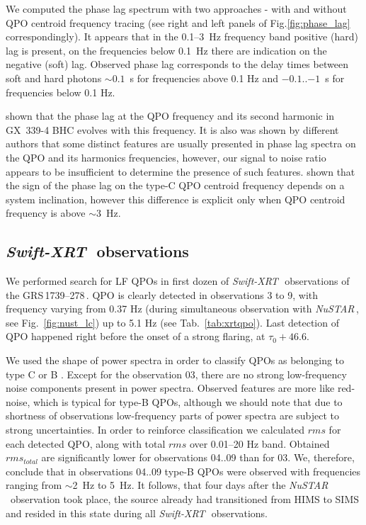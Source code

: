 \documentclass[a4paper,fleqn,usenatbib]{mnras}
\def\grs{{GRS\,1739--278\,}}
\def\swiftx{{\em Swift-XRT\,}}
\def\nustar{{\em NuSTAR\,}}
\begin{document}
We computed the phase lag spectrum with two approaches - with and without QPO centroid frequency tracing (see right and left panels of Fig.\ref{fig:phase_lag} correspondingly).
It appears that in the 0.1--3~Hz frequency band positive (hard) lag is present, on the frequencies below 0.1~Hz there are indication on the negative (soft) lag.
Observed phase lag corresponds to the delay times between soft and hard photons $\sim0.1$~s for frequencies above 0.1 Hz and $-0.1$..$-1$~s for frequencies below 0.1 Hz.

\citet{2017ApJ...845..143Z} shown that the phase lag at the QPO frequency and its second harmonic in GX~339-4 BHC evolves with this frequency. 
It is also was shown by different authors \citep[see, e.g.,][]{2013ApJ...778..136P, 2017ApJ...845..143Z} that some distinct features are usually presented in phase lag spectra on the QPO and its harmonics frequencies, however, our signal to noise ratio appears to be insufficient to determine the presence of such features.
\citet{2017MNRAS.464.2643V} shown that the sign of the phase lag on the type-C QPO centroid frequency depends on a system inclination, however this difference is explicit only when QPO centroid frequency is above $\sim3$~Hz.



\subsection{\swiftx\, observations}
We performed search for LF QPOs in first dozen of \swiftx\ observations of the \grs. 
QPO is clearly detected in observations 3 to 9, with frequency varying from 0.37 Hz (during simultaneous observation with \nustar, see Fig.~\ref{fig:nust_lc}) up to 5.1 Hz (see Tab.~\ref{tab:xrtqpo}). Last detection of QPO happened right before the onset of a strong flaring, at $\tau_{0}+46.6$. 

We used the shape of power spectra in order to classify QPOs as belonging to type C or B \citep{casella05}. 
Except for the observation 03, there are no strong low-frequency noise components present in power spectra. 
Observed features are more like red-noise, which is typical for type-B QPOs, although we should note that due to shortness of observations low-frequency parts of power spectra are subject to strong uncertainties. 
In order to reinforce classification we calculated $rms$ for each detected QPO, along with total $rms$ over 0.01--20 Hz band. 
Obtained $rms_{total}$ are significantly lower for observations 04..09 than for 03. 
We, therefore, conclude that in observations 04..09 type-B QPOs were observed with frequencies ranging from $\sim$2~Hz to 5~Hz.
It follows, that four days after the \nustar\ observation took place, the source already had transitioned from HIMS to SIMS and resided in this state during all \swiftx\ observations.
\end{document}
